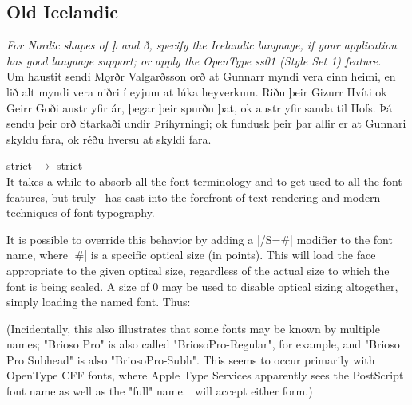 \subsection*{Old Icelandic}
{\itshape For Nordic shapes of þ and ð, specify the Icelandic
language, if your application has good language support; or apply the OpenType
ss01 (Style Set 1) feature.}\\[1ex]
Um haustit sendi Mǫrðr Valgarðsson orð at Gunnarr myndi vera einn heimi, en
lið alt myndi vera niðri í eyjum at lúka heyverkum. Riðu þeir Gizurr Hvíti ok
Geirr Goði austr yfir ár, þegar þeir spurðu þat, ok austr yfir sanda til Hofs.
Þá sendu þeir orð Starkaði undir Þríhyrningi; ok fundusk þeir þar allir er at
Gunnari skyldu fara, ok réðu hversu at skyldi fara.



\def\test#1#2{%
#2 $\to$ {\addfontfeature{#1} #2}\\}
\test{Ligatures=Historic}{strict}

It takes a while to absorb all the font terminology and to get
used to all the font features, but truly \XeTeX\ has cast
\tex into the forefront of text rendering and modern
techniques of font typography. 


It is possible to override this behavior by adding a |/S=#| modifier to the font name, where |#| is a specific optical size (in points). This will load the face appropriate to the given optical size, regardless of the actual size to which the font is being scaled. A size of 0 may be used to disable optical sizing altogether, simply loading the named font. Thus:

\begin{comment}
\begin{quote}
\begin{tabular}{ll}
\em Name and size requested&\em Font used\cr
\showfont{"Brioso Pro/S=7" at 9pt}{BriosoPro-Capt}
\showfont{"Brioso Pro/S=10" at 9pt}{BriosoPro-Regular}
\showfont{"Brioso Pro/S=18" at 9pt}{BriosoPro-Subh}
\showfont{"Brioso Pro/S=36" at 9pt}{BriosoPro-Disp}
\showfont{"Brioso Pro Subhead" at 9pt}{BriosoPro-Capt}
\showfont{"Brioso Pro Subhead/S=0" at 9pt}{BriosoPro-Subh}
\end{tabular}
\end{quote}
\end{comment}


(Incidentally, this also illustrates that some fonts may be known by multiple names; "Brioso Pro" is also called "BriosoPro-Regular", for example, and "Brioso Pro Subhead" is also "BriosoPro-Subh". This seems to occur primarily with OpenType CFF fonts, where Apple Type Services apparently sees the PostScript font name as well as the "full" name. \XeTeX\ will accept either form.)


